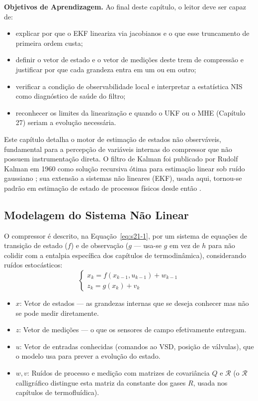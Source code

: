 \documentclass[12pt,a4paper]{article}
\numberwithin{equation}{section}
\numberwithin{table}{section}
\numberwithin{figure}{section}
\begin{document}
{	\textbf{Objetivos de Aprendizagem.} Ao final deste capítulo, o leitor
	deve ser capaz de:
	\begin{itemize}
		\item explicar por que o EKF lineariza via jacobianos e o que esse
		truncamento de primeira ordem custa;
		\item definir o vetor de estado e o vetor de medições deste trem
		de compressão e justificar por que cada grandeza entra em um ou
		em outro;
		\item verificar a condição de observabilidade local e interpretar
		a estatística NIS como diagnóstico de saúde do filtro;
		\item reconhecer os limites da linearização e quando o UKF ou o
		MHE (Capítulo 27) seriam a evolução necessária.
	\end{itemize}

	Este capítulo detalha o motor de estimação de estados não observáveis, fundamental para a percepção de variáveis internas do compressor que não possuem instrumentação direta. O filtro de Kalman foi publicado por Rudolf Kalman em 1960 como solução recursiva ótima para estimação linear sob ruído gaussiano \cite{kalman}; sua extensão a sistemas não lineares (EKF), usada aqui, tornou-se padrão em estimação de estado de processos físicos desde então \cite{simon}.
	
	\subsection{Modelagem do Sistema Não Linear}
	O compressor é descrito, na Equação~\eqref{eq:s21-1}, por um sistema de equações de transição de estado ($f$) e de observação ($g$ — usa-se $g$ em vez de $h$ para não colidir com a entalpia específica dos capítulos de termodinâmica), considerando ruídos estocásticos:
	\begin{equation}\label{eq:s21-1}
	\begin{cases}
		x_k = f(x_{k-1}, u_{k-1}) + w_{k-1} \\
		z_k = g(x_k) + v_k
	\end{cases}
\end{equation}
	\begin{itemize}
		\item $x$: Vetor de estados — as grandezas internas que se deseja conhecer mas não se pode medir diretamente.
		\item $z$: Vetor de medições — o que os sensores de campo efetivamente entregam.
		\item $u$: Vetor de entradas conhecidas (comandos ao VSD, posição de válvulas), que o modelo usa para prever a evolução do estado.
		\item $w, v$: Ruídos de processo e medição com matrizes de covariância $Q$ e $\mathcal{R}$ (o $\mathcal{R}$ calligráfico distingue esta matriz da constante dos gases $R$, usada nos capítulos de termofluídica).
	\end{itemize}

}
\end{document}
